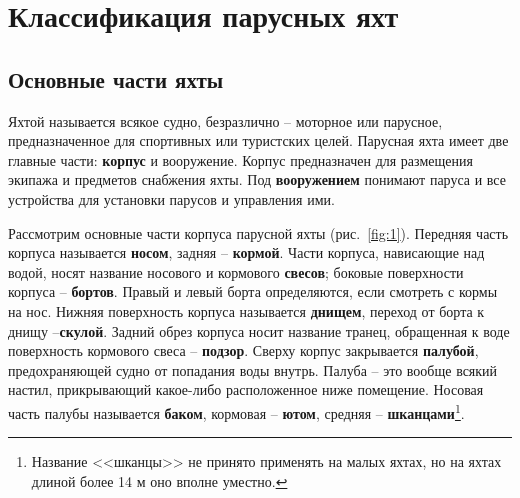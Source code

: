 \documentclass[a4paper, 12pt, twoside, final]{scrbook}
\begin{document}
\chapter{Классификация парусных яхт}

%
%

\section{Основные части яхты}

Яхтой называется всякое судно, безразлично \--- моторное или парусное,
предназначенное для спортивных или туристских целей. Парусная яхта
имеет две главные части: \textbf{корпус} и вооружение.
Корпус предназначен для размещения экипажа и предметов снабжения яхты.
Под \textbf{вооружением} понимают паруса
и все устройства для установки парусов и управления ими.

Рассмотрим основные части корпуса парусной яхты (рис.~\ref{fig:1}).
Передняя часть корпуса называется \textbf{носом}, задняя
\--- \textbf{кормой}. Части корпуса, нависающие над
водой, носят название носового и кормового \textbf{свесов};
боковые поверхности корпуса \--- \textbf{бортов}. Правый
и левый борта определяются, если смотреть с кормы на нос. Нижняя поверхность
корпуса называется \textbf{днищем}, переход от
борта к днищу \---\textbf{скулой}. Задний обрез корпуса
носит название транец, обращенная к воде поверхность кормового свеса \---
\textbf{подзор}. Сверху корпус закрывается \textbf{палубой},
предохраняющей судно от попадания воды внутрь. Палуба \--- это вообще
всякий настил, прикрывающий какое-либо расположенное ниже помещение.
Носовая часть палубы называется \textbf{баком}, кормовая
\--- \textbf{ютом}, средняя \--- \textbf{шканцами}\footnote{Название <<шканцы>> не принято применять на малых яхтах, но на яхтах
длиной более 14 м оно вполне уместно.}.
\end{document}
